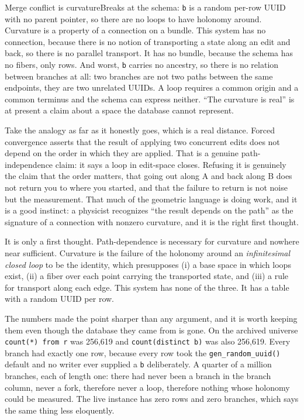 \begin{Analogy}{Merge conflict is curvature}{Breaks at the schema: \texttt{b} is a random per-row UUID with no parent pointer, so there are no loops to have holonomy around.}
Curvature is a property of a connection on a bundle. This system has no connection, because there is no notion of transporting a state along an edit and back, so there is no parallel transport. It has no bundle, because the schema has no fibers, only rows. And worst, \texttt{b} carries no ancestry, so there is no relation between branches at all: two branches are not two paths between the same endpoints, they are two unrelated UUIDs. A loop requires a common origin and a common terminus and the schema can express neither. ``The curvature is real'' is at present a claim about a space the database cannot represent.

Take the analogy as far as it honestly goes, which is a real distance. Forced convergence asserts that the result of applying two concurrent edits does not depend on the order in which they are applied. That is a genuine path-independence claim: it says a loop in edit-space closes. Refusing it is genuinely the claim that the order matters, that going out along A and back along B does not return you to where you started, and that the failure to return is not noise but the measurement. That much of the geometric language is doing work, and it is a good instinct: a physicist recognizes ``the result depends on the path'' as the signature of a connection with nonzero curvature, and it is the right first thought.

It is only a first thought. Path-dependence is necessary for curvature and nowhere near sufficient. Curvature is the failure of the holonomy around an \emph{infinitesimal closed loop} to be the identity, which presupposes (i) a base space in which loops exist, (ii) a fiber over each point carrying the transported state, and (iii) a rule for transport along each edge. This system has none of the three. It has a table with a random UUID per row.
\end{Analogy}

The numbers made the point sharper than any argument, and it is worth keeping them even though the database they came from is gone. On the archived universe \texttt{count(*) from r} was 256,619 and \texttt{count(distinct b)} was also 256,619. Every branch had exactly one row, because every row took the \texttt{gen\_random\_uuid()} default and no writer ever supplied a \texttt{b} deliberately. A quarter of a million branches, each of length one: there had never been a branch in the branch column, never a fork, therefore never a loop, therefore nothing whose holonomy could be measured. The live instance has zero rows and zero branches, which says the same thing less eloquently.

